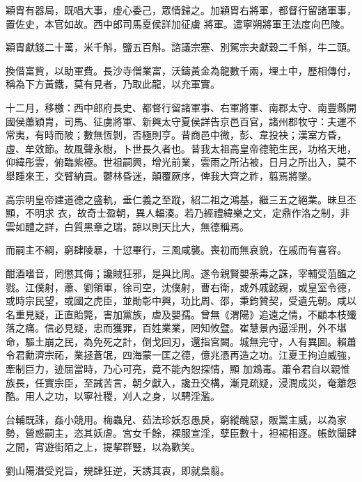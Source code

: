 \begin{pinyinscope}
 穎胄有器局，既唱大事，虛心委己，眾情歸之。加穎胄右將軍，都督行留諸軍事，置佐史，本官如故。西中郎司馬夏侯詳加征虜
 將軍。遣寧朔將軍王法度向巴陵。



 穎胄獻錢二十萬，米千斛，鹽五百斛。諮議宗塞、別駕宗夬獻穀二千斛，牛二頭。



 換借富貲，以助軍費。長沙寺僧業富，沃鑄黃金為龍數千兩，埋土中，歷相傳付，稱為下方黃鐵，莫有見者，乃取此龍，以充軍實。



 十二月，移檄：西中郎府長史、都督行留諸軍事、右軍將軍、南郡太守、南豐縣開國侯蕭穎胄，司馬、征虜將軍、新興太守夏侯詳告京邑百官，諸州郡牧守：夫運不常夷，有時而陂；數無恆剝，否極則亨。昔商邑中微，彭、韋投袂；漢室方昏，虛、牟效節。故風聲永樹，卜世長久者也。昔我太祖高皇帝德範生民，功格天地，仰緯彤雲，俯臨紫極。世祖嗣興，增光前業，雲雨之所沾被，日月之所出入，莫不舉踵來王，交臂納貢。鬱林昏迷，顛覆厥序，俾我大齊之祚，翦焉將墜。



 高宗明皇帝建道德之盛軌，垂仁義之至蹤，紹二祖之鴻基，繼三五之絕業。昧旦丕顯，不明求
 衣，故奇士盈朝，異人輻湊。若乃經禮緯樂之文，定鼎作洛之制，非雲如醴之詳，白質黑章之瑞，諒以則天比大，無德稱焉。



 而嗣主不綱，窮肆陵暴，十愆畢行，三風咸襲。喪初而無哀貌，在戚而有喜容。



 酣酒嗜音，罔懲其侮；讒賊狂邪，是與比周。遂令親賢嬰荼毒之誅，宰輔受菹醢之戮。江僕射，蕭、劉領軍，徐司空，沈僕射，曹右衛，或外戚懿親，或皇室令德，或時宗民望，或國之虎臣，並勛彰中興，功比周、邵，秉鈞贊契，受遺先朝。咸以名重見疑，正直貽斃，害加黨族，虐及嬰孺。曾無《渭陽》追遠之情，不顧本枝殲落之痛。信必見疑，忠而獲罪，百姓業業，罔知攸暨。崔慧景內逼淫刑，外不堪命，驅土崩之民，為免死之計，倒戈回刃，還指宮闕。城無完守，人有異圖。賴蕭令君勳濟宗祏，業拯蒼氓，四海蒙一匡之德，億兆憑再造之功。江夏王拘迫威強，牽制巨力，迹屈當時，乃心可亮，竟不能內恕探情，顯
 加鴆毒。蕭令君自以親惟族長，任實宗臣，至誡苦言，朝夕獻入，讒丑交構，漸見疏疑，浸潤成災，奄離怨酷。用人之功，以寧社稷，刈人之身，以騁淫濫。



 台輔既誅，姦小競用。梅蟲兒、茹法珍妖忍愚戾，窮縱醜惡，販鬻主威，以為家勢，營惑嗣主，恣其妖虐。宮女千餘，裸服宣淫，孽臣數十，袒裼相逐。帳飲闤肆之間，宵遊街陌之上，提挈群豎，以為歡笑。



 劉山陽潛受兇旨，規肆狂逆，天誘其衷，即就梟翦。




\end{pinyinscope}
